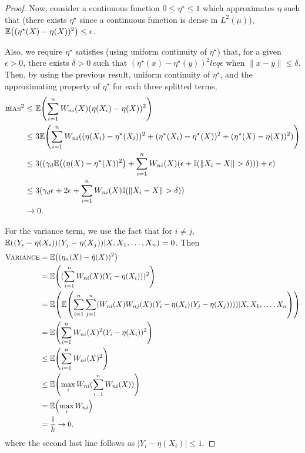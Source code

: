 \begin{proof}
  Now, consider a continuous function $0 \leq \eta^{\star} \leq 1$
  which approximates $\eta$ such that (there exists $\eta^{\star}$
  since a continuous function is dense in $L^{2}(\mu)$),
  $\E{(\eta^{\star}(X) - \eta(X))^{2}} \leq \epsilon$.

  Also, we require $\eta^{\star}$ satisfies (using uniform continuity
  of $\eta^{\star}$) that, for a given $\epsilon > 0$, there exists
  $\delta > 0$ such that $(\eta^{\star}(x) - \eta^{\star}(y))^{2} leq
  \epsilon$ when $\| x - y \| \leq \delta$.  Then, by using the
  previous result, uniform continuity of $\eta^{\star}$, and the
  approximating property of $\eta^{\star}$ for each three splitted
  terms,
  \begin{align}
    \label{eq:162}
    \textsc{bias}^{2} &\leq \E{\sum_{i=1}^{n} W_{ni}(X)(\eta(X_{i}) -
      \eta(X))^{2}} \\
    \label{eq:163}
    &\leq 3 \E{\sum_{i=1}^{n} W_{ni}((\eta(X_{i}) - \eta^{\star}(X_{i}))^{2}
    + (\eta^{\star}(X_{i}) - \eta^{\star}(X))^{2} + (\eta^{\star}(X) -
    \eta(X))^{2})} \\
  \label{eq:164}
  &\leq 3 ((\gamma_{d} \E{(\eta(X) - \eta^{\star}(X))^{2}} +
  \sum_{i=1}^{n} W_{ni}(X) (\epsilon + \I{\| X_{i} - X \| > \delta}))
  + \epsilon) \\
  \label{eq:165}
  &\leq 3(\gamma_{d} \epsilon + 2 \epsilon + \sum_{i=1}^{n} W_{ni}(X)
  \I{\| X_{i} - X \| > \delta}) \\
  \label{eq:166}
  &\rightarrow 0.
  \end{align}

  For the variance term, we use the fact that for $i \neq j$,
  $\E{(Y_{i} - \eta(X_{i}))(Y_{j} - \eta(X_{j})) | X, X_{1}, \dots,
    X_{n}} = 0$. Then
  \begin{align}
    \label{eq:167}
    \textsc{Variance} &= \E{(\eta_{n}(X) - \tilde \eta(X))^{2}} \\
    \label{eq:168}
    &= \E{(\sum_{i=1}^{n} W_{ni}(X)(Y_{i} - \eta(X_{i})))^{2}} \\
    \label{eq:169}
    &= \E{\E{\sum_{i=1}^{n} \sum_{j=1}^{n} (W_{ni}(X) W_{nj}(X)(Y_{i}
        - \eta(X_{i})(Y_{j} - \eta(X_{j})))) | X, X_{1}, \dots,
        X_{n}}} \\
    \label{eq:170}
    &= \E{\sum_{i=1}^{n} W_{ni}(X)^{2} (Y_{i} - \eta(X_{i}))^{2}} \\
    \label{eq:171}
    &\leq \E{\sum_{i=1}^{n} W_{ni}(X)^{2}} \\
    \label{eq:172}
    &\leq \E{\max_{i} W_{ni}(\sum_{i=1}^{n} W_{ni}(X))} \\
    \label{eq:173}
    &= \E{\max_{i} W_{ni}} \\
    \label{eq:174}
    &= \frac{1}{k} \rightarrow 0.
  \end{align} where the second last line follows as $|Y_{i} -
  \eta(X_{i}) | \leq 1$.
\end{proof} 

